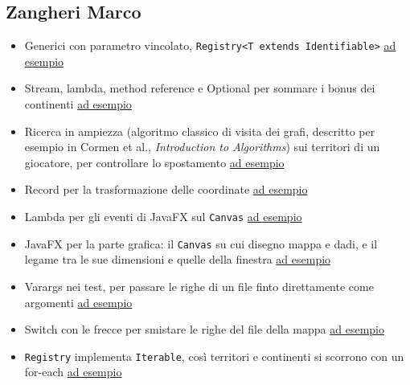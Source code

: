 \documentclass[a4paper,12pt]{report}
\begin{document}
\subsection{Zangheri Marco}
\begin{itemize}
    \item Generici con parametro vincolato, \texttt{Registry<T extends Identifiable>} \href{https://github.com/MoneIsProgrammer/risiko/blob/90268fcf19c4a90738d5f2d6c9d17ea0389a93c0/src/main/java/it/unibo/risiko/model/common/Registry.java#L18}{ad esempio}
    \item Stream, lambda, method reference e Optional per sommare i bonus dei continenti \href{https://github.com/MoneIsProgrammer/risiko/blob/90268fcf19c4a90738d5f2d6c9d17ea0389a93c0/src/main/java/it/unibo/risiko/model/map/GameMapImpl.java#L85-L90}{ad esempio}
    \item Ricerca in ampiezza (algoritmo classico di visita dei grafi, descritto per esempio in Cormen et al., \emph{Introduction to Algorithms}) sui territori di un giocatore, per controllare lo spostamento \href{https://github.com/MoneIsProgrammer/risiko/blob/90268fcf19c4a90738d5f2d6c9d17ea0389a93c0/src/main/java/it/unibo/risiko/model/map/GameMapImpl.java#L93-L121}{ad esempio}
    \item Record per la trasformazione delle coordinate \href{https://github.com/MoneIsProgrammer/risiko/blob/90268fcf19c4a90738d5f2d6c9d17ea0389a93c0/src/main/java/it/unibo/risiko/view/map/ViewTransform.java#L13}{ad esempio}
    \item Lambda per gli eventi di JavaFX sul \texttt{Canvas} \href{https://github.com/MoneIsProgrammer/risiko/blob/90268fcf19c4a90738d5f2d6c9d17ea0389a93c0/src/main/java/it/unibo/risiko/view/map/MapCanvas.java#L93-L95}{ad esempio}
    \item JavaFX per la parte grafica: il \texttt{Canvas} su cui disegno mappa e dadi, e il legame tra le sue dimensioni e quelle della finestra \href{https://github.com/MoneIsProgrammer/risiko/blob/90268fcf19c4a90738d5f2d6c9d17ea0389a93c0/src/main/java/it/unibo/risiko/view/map/MapCanvas.java#L89-L100}{ad esempio}
    \item Varargs nei test, per passare le righe di un file finto direttamente come argomenti \href{https://github.com/MoneIsProgrammer/risiko/blob/90268fcf19c4a90738d5f2d6c9d17ea0389a93c0/src/test/java/it/unibo/risiko/model/map/MapLoaderTest.java#L60-L62}{ad esempio}
    \item Switch con le frecce per smistare le righe del file della mappa \href{https://github.com/MoneIsProgrammer/risiko/blob/90268fcf19c4a90738d5f2d6c9d17ea0389a93c0/src/main/java/it/unibo/risiko/model/map/MapLoader.java#L82-L99}{ad esempio}
    \item \texttt{Registry} implementa \texttt{Iterable}, così territori e continenti si scorrono con un for-each \href{https://github.com/MoneIsProgrammer/risiko/blob/90268fcf19c4a90738d5f2d6c9d17ea0389a93c0/src/main/java/it/unibo/risiko/model/common/Registry.java#L106-L110}{ad esempio}
\end{itemize}
\end{document}
